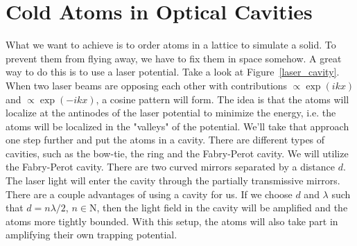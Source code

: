 \section{Cold Atoms in Optical Cavities}
What we want to achieve is to order atoms in a lattice to simulate a solid. To prevent them from flying away, we have to fix them in space somehow. A great way to do this is to use a laser potential. Take a look at Figure~\ref{laser_cavity}. When two laser beams are opposing each other with contributions $\propto \exp(ikx)$ and $\propto \exp(-ikx)$, a cosine pattern will form. The idea is that the atoms will localize at the antinodes of the laser potential to minimize the energy, i.e. the atoms will be localized in the "valleys" of the potential. We'll take that approach one step further and put the atoms in a cavity. There are different types of cavities, such as the bow-tie, the ring and the Fabry-Perot cavity. We will utilize the Fabry-Perot cavity. There are two curved mirrors separated by a distance $d$. The laser light will enter the cavity through the partially transmissive mirrors. There are a couple advantages of using a cavity for us. If we choose $d$ and $\lambda$ such that $d = n \lambda / 2$, $n \in \mathrm{N}$, then the light field in the cavity will be amplified and the atoms more tightly bounded. With this setup, the atoms will also take part in amplifying their own trapping potential.

